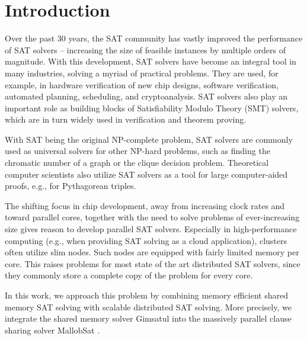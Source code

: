 \documentclass[12pt,a4paper,twoside]{scrartcl}
\numberwithin{equation}{section}
\begin{document}
\tableofcontents

\clearpage


\listoffigures
\listoftables

\clearpage


\section{Introduction}

Over the past 30 years, the SAT community has vastly improved the performance of SAT solvers -- increasing the size of feasible instances by multiple orders of magnitude. With this development, SAT solvers have become an integral tool in many industries, solving a myriad of practical problems. They are used, for example, in hardware verification of new chip designs, software verification, automated planning, scheduling, and cryptoanalysis. SAT solvers also play an important role as building blocks of Satisfiability Modulo Theory (SMT) solvers, which are in turn widely used in verification and theorem proving.

With SAT being the original NP-complete problem, SAT solvers are commonly used as universal solvers for other NP-hard problems, such as finding the chromatic number of a graph or the clique decision problem. Theoretical computer scientists also utilize SAT solvers as a tool for large computer-aided proofs, e.g., for Pythagorean triples.

The shifting focus in chip development, away from increasing clock rates and toward parallel cores, together with the need to solve problems of ever-increasing size gives reason to develop parallel SAT solvers. Especially in high-performance computing (e.g., when providing SAT solving as a cloud application), clusters often utilize slim nodes. Such nodes are equipped with fairly limited memory per core. This raises problems for most state of the art distributed SAT solvers, since they commonly store a complete copy of the problem for every core.

In this work, we approach this problem by combining memory efficient shared memory SAT solving with scalable distributed SAT solving. More precisely, we integrate the shared memory solver Gimsatul \cite{gimsatul} into the massively parallel clause sharing solver MallobSat \cite{mallobSat}.
\end{document}
